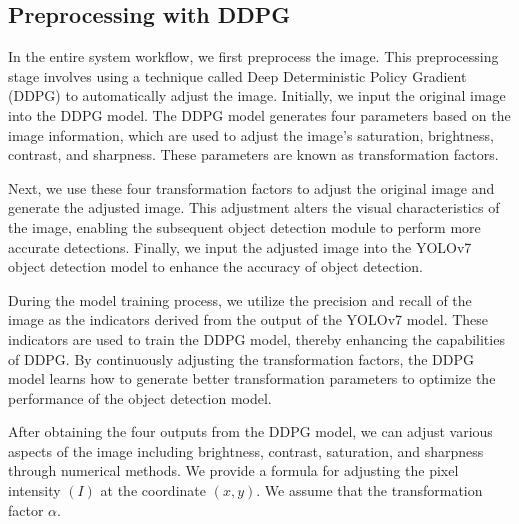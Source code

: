\documentclass{PHlab-thesis}
\begin{document}
\subsection{Preprocessing with DDPG}
In the entire system workflow, we first preprocess the image. This preprocessing stage involves using a technique called Deep Deterministic Policy Gradient (DDPG) to automatically adjust the image. Initially, we input the original image into the DDPG model. The DDPG model generates four parameters based on the image information, which are used to adjust the image's saturation, brightness, contrast, and sharpness. These parameters are known as transformation factors.

Next, we use these four transformation factors to adjust the original image and generate the adjusted image. This adjustment alters the visual characteristics of the image, enabling the subsequent object detection module to perform more accurate detections. Finally, we input the adjusted image into the YOLOv7 object detection model to enhance the accuracy of object detection.

During the model training process, we utilize the precision and recall of the image as the indicators derived from the output of the YOLOv7 model. These indicators are used to train the DDPG model, thereby enhancing the capabilities of DDPG. By continuously adjusting the transformation factors, the DDPG model learns how to generate better transformation parameters to optimize the performance of the object detection model.

After obtaining the four outputs from the DDPG model, we can adjust various aspects of the image including brightness, contrast, saturation, and sharpness through numerical methods. We provide a formula for adjusting the pixel intensity $(I)$ at the coordinate $(x,y)$. We assume that the transformation factor $\alpha$.
\end{document}
